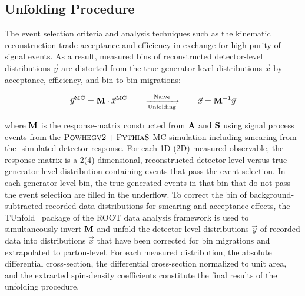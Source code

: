 \begin{refsection}
\section{Unfolding Procedure}
The event selection criteria and analysis techniques such as the \ttbar kinematic reconstruction trade acceptance and efficiency in exchange for high purity of signal events.
As a result, measured bins of reconstructed detector-level distributions $\vec{y}$ are distorted from the true generator-level distributions $\vec{x}$ by acceptance, efficiency, and bin-to-bin migrations:
\begin{linenomath*}
\begin{align}
\vec{y}^{\text{MC}} = \mathbf{M} \cdot \vec{x}^{\text{MC}} \quad \quad \xrightarrow[\text{Unfolding}]{\text{Naive}} \quad \quad \vec{x} = \mathbf{M}^{-1} \vec{y}
\end{align}
\end{linenomath*}
where $\mathbf{M}$ is the response-matrix constructed from $\mathbf{A}$ and $\mathbf{S}$ using signal process events from the ${\textsc{Powhegv2}} + {\textsc{Pythia8}}$ MC simulation including smearing from the \Geant-simulated detector response.
For each 1D (2D) measured observable, the response-matrix is a 2(4)-dimensional, reconstructed detector-level versus true generator-level distribution containing events that pass the event selection.
In each generator-level bin, the true generated events in that bin that do not pass the event selection are filled in the underflow.
To correct the bin of background-subtracted recorded data distributions for smearing and acceptance effects, the TUnfold~\cite{TUnfold} package of the ROOT data analysis framework is used to simultaneously invert $\mathbf{M}$ and unfold the detector-level distributions $\vec{y}$ of recorded data into distributions $\vec{x}$ that have been corrected for bin migrations and extrapolated to parton-level.
For each measured distribution, the absolute differential cross-section, the differential cross-section normalized to unit area, and the extracted spin-density coefficients constitute the final results of the unfolding procedure.




\end{refsection}

